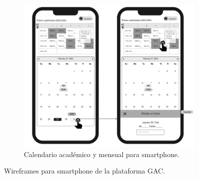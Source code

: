 \begin{figure}[!tb]
\begin{subfigure}[b]{0.7\textwidth}
        \includegraphics[width=\textwidth]{./imagenes/Mockups_smartphone2.png}
        \caption{Calendario académico y mensual para smartphone.}
    \end{subfigure}
    \caption{Wireframes para smartphone de la plataforma GAC.}
\end{figure}
